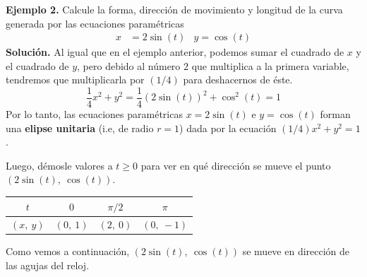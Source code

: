 \documentclass[12pt]{article}
\begin{document}
\textbf{Ejemplo 2.} Calcule la forma, dirección de movimiento y longitud de la curva generada por las ecuaciones paramétricas
\begin{align*}
  x &= 2 \sin(t) & y = \cos(t)
\end{align*}
\textbf{Solución.} Al igual que en el ejemplo anterior, podemos sumar el cuadrado de $x$ y el cuadrado de $y$, pero debido al número $2$ que multiplica a la primera variable, tendremos que multiplicarla por $(1/4)$ para deshacernos de éste.
\[
  \frac{1}{4} x^{2} + y^{2} = \frac{1}{4} (2 \sin(t))^{2} + \cos^{2}(t) = 1
\]
Por lo tanto, las ecuaciones paramétricas $x = 2 \sin(t)$ e $y = \cos(t)$ forman una \textbf{elipse unitaria} (i.e, de radio $r = 1$) dada por la ecuación $(1/4) x^{2} + y^{2} = 1$.

Luego, démosle valores a $t \geq 0$ para ver en qué dirección se mueve el punto $(2 \sin(t), \ \cos(t))$.

\begin{table}[hbt!]
\centering

\begin{tabular}{c|c c c}
$t$ & $0$ & $\pi / 2$ & $\pi$ \\
\hline
$(x, \ y)$ & $(0, \ 1)$  & $(2, \ 0)$  & $(0, \ -1)$
\end{tabular}

\end{table}

Como vemos a continuación, $(2 \sin(t), \ \cos(t))$ se mueve en dirección de las agujas del reloj.

\begin{figure}[hbt!]
\centering


\end{figure}
\end{document}
